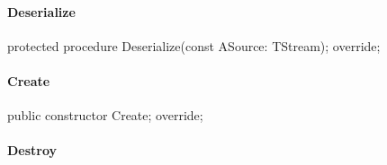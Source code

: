 \documentclass{report}
\newif\ifpdf
\begin{document}
\paragraph*{Deserialize}\hspace*{\fill}

\label{PasDoc_Items.TBaseItem-Deserialize}
\begin{list}{}{
\setlength{\itemindent}{0cm}
\setlength{\listparindent}{0cm}
\setlength{\leftmargin}{\evensidemargin}
\addtolength{\leftmargin}{\tmplength}
\settowidth{\labelsep}{X}
\addtolength{\leftmargin}{\labelsep}
\setlength{\labelwidth}{\tmplength}
}
\item[\textbf{Declaration}\hfill]
\ifpdf
\begin{flushleft}
\fi
\begin{ttfamily}
protected procedure Deserialize(const ASource: TStream); override;\end{ttfamily}

\ifpdf
\end{flushleft}
\fi

\end{list}
\paragraph*{Create}\hspace*{\fill}

\label{PasDoc_Items.TBaseItem-Create}
\begin{list}{}{
\setlength{\itemindent}{0cm}
\setlength{\listparindent}{0cm}
\setlength{\leftmargin}{\evensidemargin}
\addtolength{\leftmargin}{\tmplength}
\settowidth{\labelsep}{X}
\addtolength{\leftmargin}{\labelsep}
\setlength{\labelwidth}{\tmplength}
}
\item[\textbf{Declaration}\hfill]
\ifpdf
\begin{flushleft}
\fi
\begin{ttfamily}
public constructor Create; override;\end{ttfamily}

\ifpdf
\end{flushleft}
\fi

\end{list}
\paragraph*{Destroy}\hspace*{\fill}
\end{document}
